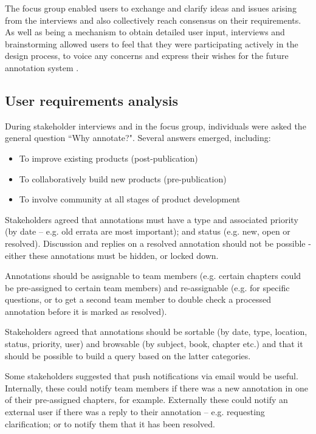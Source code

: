 The focus group enabled users to exchange and clarify ideas and issues arising from the interviews and also collectively reach consensus on their requirements. As well as being a mechanism to obtain detailed user input, interviews and brainstorming allowed users to feel that they were participating actively in the design process, to voice any concerns and express their wishes for the future annotation system \citep[p. 365]{RogersPreece}. 

\subsection{User requirements analysis}
During stakeholder interviews and in the focus group, individuals were asked the general question ``Why annotate?". Several answers emerged, including: 
\begin{itemize}
 \item To improve existing products (post-publication)
 \item To collaboratively build new products (pre-publication)
 \item To involve community at all stages of product development
\end{itemize}

Stakeholders agreed that annotations must have a type and associated priority (by date – e.g. old errata are most important); and status (e.g. new, open or resolved). Discussion and replies on a resolved annotation should not be possible - either these annotations must be hidden, or locked down. 

Annotations should be assignable to team members (e.g. certain chapters could be pre-assigned to certain team members) and re-assignable (e.g. for specific questions, or to get a second team member to double check a processed annotation before it is marked as resolved).

Stakeholders agreed that annotations should be sortable (by date, type, location, status, priority, user) and browsable (by subject, book, chapter etc.) and that it should be possible to build a query based on the latter categories.

Some stakeholders suggested that push notifications via email would be useful. Internally, these could notify team members if there was a new annotation in one of their pre-assigned chapters, for example. Externally these could notify an external user if there was a reply to their annotation – e.g. requesting clarification; or to notify them that it has been resolved.

